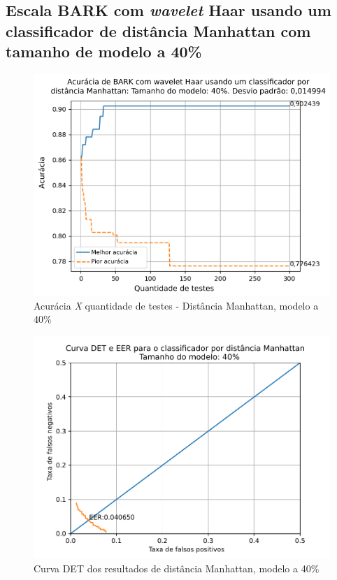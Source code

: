 			\FloatBarrier
		\subsection{Escala BARK com \textit{wavelet} Haar usando um classificador de distância Manhattan com tamanho de modelo a 40\%}
		
			
			
			\begin{figure}[!ht]
				\centering
				\includegraphics[width=\linewidth]{images/results/confusionMatrices/classifier_Manhattan_40.png}
				\caption{Acurácia \textit{X} quantidade de testes - Distância Manhattan, modelo a 40\%}
				\label{fig:classifiermanhattan40}
			\end{figure}
		
			\begin{figure}[!h]
				\centering
				\includegraphics[width=.9\linewidth]{images/results/det/DET_for_classifier_Manhattan_40}
				\caption{Curva DET dos resultados de distância Manhattan, modelo a 40\%}
				\label{fig:detforclassifiermanhattan40}
			\end{figure}
		
